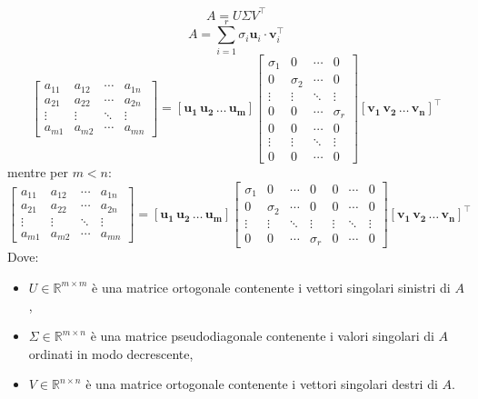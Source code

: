 \documentclass[11pt]{article}
\begin{document}
\[
A = U \Sigma V^\top      
\]
$$A = \sum_{i=1}^{r} \sigma_i \mathbf{u}_i \cdot \mathbf{v}_i^\top       $$
\[
\begin{bmatrix}
a_{11} & a_{12} & \cdots & a_{1n} \\
a_{21} & a_{22} & \cdots & a_{2n} \\
\vdots & \vdots & \ddots & \vdots \\
a_{m1} & a_{m2} & \cdots & a_{mn}
\end{bmatrix} = \mathbf{[u_1 \, u_2 \, \dots \, u_m]} \begin{bmatrix}
\sigma_1 & 0 & \cdots & 0 \\
0 & \sigma_2 & \cdots & 0 \\
\vdots & \vdots & \ddots & \vdots \\
0 & 0 & \cdots & \sigma_r \\
0 & 0 & \cdots & 0 \\
\vdots & \vdots & \ddots & \vdots \\
0 & 0 & \cdots & 0
\end{bmatrix} \mathbf{[v_1 \, v_2 \, \dots \, v_n]}^\top      
\]
mentre per $m<n$:
\[
\begin{bmatrix}
a_{11} & a_{12} & \cdots & a_{1n} \\
a_{21} & a_{22} & \cdots & a_{2n} \\
\vdots & \vdots & \ddots & \vdots \\
a_{m1} & a_{m2} & \cdots & a_{mn}
\end{bmatrix} = \mathbf{[u_1 \, u_2 \, \dots \, u_m]}
\begin{bmatrix}
\sigma_1 & 0 & \cdots & 0 & 0 & \cdots & 0 \\
0 & \sigma_2 & \cdots & 0 & 0 & \cdots & 0 \\
\vdots & \vdots & \ddots & \vdots & \vdots & \ddots & \vdots \\
0 & 0 & \cdots & \sigma_r & 0 & \cdots & 0
\end{bmatrix} \mathbf{[v_1 \, v_2 \, \dots \, v_n]}^\top      
\]
Dove:
\begin{itemize}
    \item $U\in\mathbb{R}^{m\times m}$ è una matrice ortogonale contenente i vettori singolari sinistri di $A$,
    \item $\Sigma\in\mathbb{R}^{m\times n}$ è una matrice pseudodiagonale contenente i valori singolari di $A$ ordinati in modo decrescente,
    \item $V\in\mathbb{R}^{n\times n}$ è una matrice ortogonale contenente i vettori singolari destri di $A$.
\end{itemize}
\end{document}
